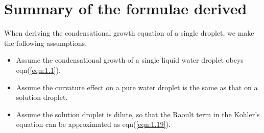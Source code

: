 \documentclass[12pt]{article}
\begin{document}







\section{Summary of the formulae derived}

When deriving the condensational growth equation of a single droplet, we make the following assumptions.
\begin{itemize}
\item Assume the condensational growth of a single liquid water droplet obeys eqn(\ref{eqn:1.1}).
\item Assume the curvature effect on a pure water droplet is the same as that on a solution droplet.
\item Assume the solution droplet is dilute, so that the Raoult term in the Kohler's equation can be approximated as eqn(\ref{eqn:1.19}).
\end{itemize}
\end{document}

